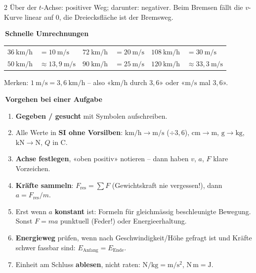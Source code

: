 \documentclass[8pt,a4paper]{extarticle}
\makeatletter
\newcommand{\T}[1]{%
  \vspace{2.2mm plus 0.6mm}%
  \noindent\colorbox{ak}{\color{white}\bfseries\small\,#1\,}\par
  \vspace{0.8mm}\nobreak\ignorespaces}
\newcommand{\RT}[2]{%
  \begin{tabular}{@{}#1@{}}#2\end{tabular}\par}
\makeatother
\begin{document}
\begin{multicols}{2}
\vspace{0.6mm}
Über der $t$-Achse: positiver Weg; darunter: negativer. Beim Bremsen fällt die $v$-Kurve linear auf $0$, die Dreiecksfläche ist der Bremsweg.

\T{Schnelle Umrechnungen}

\RT{@{}l@{\ }l@{\hspace{3mm}}l@{\ }l@{\hspace{3mm}}l@{\ }l@{}}{
$36\ \mathrm{km/h}$ & $=10\ \mathrm{m/s}$ & $72\ \mathrm{km/h}$ & $=20\ \mathrm{m/s}$ & $108\ \mathrm{km/h}$ & $=30\ \mathrm{m/s}$ \\
$50\ \mathrm{km/h}$ & $\approx13{,}9\ \mathrm{m/s}$ & $90\ \mathrm{km/h}$ & $=25\ \mathrm{m/s}$ & $120\ \mathrm{km/h}$ & $\approx33{,}3\ \mathrm{m/s}$ \\
}

\vspace{0.6mm}
Merken: $1\ \mathrm{m/s} = 3{,}6\ \mathrm{km/h}$ – also «$\mathrm{km/h}$ durch $3{,}6$» oder «$\mathrm{m/s}$ mal $3{,}6$».

\T{Vorgehen bei einer Aufgabe}

\begin{enumerate}\itemsep0.3mm   
\item \textbf{Gegeben / gesucht} mit Symbolen aufschreiben.
\item Alle Werte in \textbf{SI ohne Vorsilben}: $\mathrm{km/h}\to\mathrm{m/s}$ ($\div3{,}6$), $\mathrm{cm}\to\mathrm{m}$, $\mathrm{g}\to\mathrm{kg}$, $\mathrm{kN}\to\mathrm{N}$, $Q$ in $\mathrm{C}$.
\item \textbf{Achse festlegen}, «oben positiv» notieren – dann haben $v$, $a$, $F$ klare Vorzeichen.
\item \textbf{Kräfte sammeln}: $F_{\text{res}} = \sum F$ (Gewichtskraft nie vergessen!), dann $a=F_{\text{res}}/m$.
\item Erst wenn $a$ \textbf{konstant} ist: Formeln für gleichmässig beschleunigte Bewegung. Sonst $F=ma$ punktuell (Feder!) oder Energieerhaltung.
\item \textbf{Energieweg} prüfen, wenn nach Geschwindigkeit/Höhe gefragt ist und Kräfte schwer fassbar sind: $E_{\text{Anfang}}=E_{\text{Ende}}$.
\item Einheit am Schluss \textbf{ablesen}, nicht raten: $\mathrm{N/kg}=\mathrm{m/s^2}$, $\mathrm{N\,m}=\mathrm{J}$.
\end{enumerate}


\end{multicols}
\end{document}
